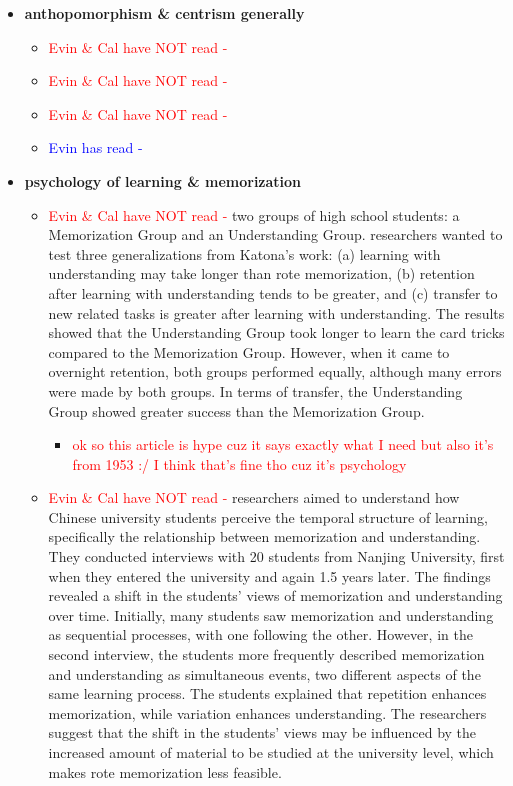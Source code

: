 \documentclass{article}
\begin{document}
\begin{itemize}
    \item \textbf{anthopomorphism \& centrism generally}
    \begin{itemize}
        \item \textcolor{red}{Evin \& Cal have NOT read - } \cite{brooke2000wise}
        \item \textcolor{red}{Evin \& Cal have NOT read - } 
        \item \textcolor{red}{Evin \& Cal have NOT read - }
        \item \textcolor{blue}{Evin has read -}
    \end{itemize}

    \item \textbf{psychology of learning \& memorization}
    \begin{itemize}
        \item \textcolor{red}{Evin \& Cal have NOT read - } \cite{hilgard1953rote} two groups of high school students: a Memorization Group and an Understanding Group. researchers wanted to test three generalizations from Katona's work: (a) learning with understanding may take longer than rote memorization, (b) retention after learning with understanding tends to be greater, and (c) transfer to new related tasks is greater after learning with understanding. The results showed that the Understanding Group took longer to learn the card tricks compared to the Memorization Group. However, when it came to overnight retention, both groups performed equally, although many errors were made by both groups. In terms of transfer, the Understanding Group showed greater success than the Memorization Group.
        \begin{itemize}
            \item \textcolor{red}{ok so this article is hype cuz it says exactly what I need but also it's from 1953 :/ I think that's fine tho cuz it's psychology}
        \end{itemize}
        \item \textcolor{red}{Evin \& Cal have NOT read - } \cite{marton2005read} researchers aimed to understand how Chinese university students perceive the temporal structure of learning, specifically the relationship between memorization and understanding. They conducted interviews with 20 students from Nanjing University, first when they entered the university and again 1.5 years later. The findings revealed a shift in the students' views of memorization and understanding over time. Initially, many students saw memorization and understanding as sequential processes, with one following the other. However, in the second interview, the students more frequently described memorization and understanding as simultaneous events, two different aspects of the same learning process. The students explained that repetition enhances memorization, while variation enhances understanding. The researchers suggest that the shift in the students' views may be influenced by the increased amount of material to be studied at the university level, which makes rote memorization less feasible.

\end{itemize}
\end{itemize}
\end{document}
